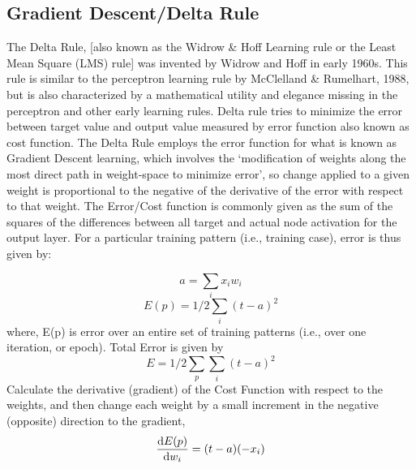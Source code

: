 \documentclass[a4paper,12pt]{report}
\begin{document}
\subsection{Gradient Descent/Delta Rule}
The Delta Rule, [also known as the Widrow \& Hoff Learning rule or the Least Mean Square (LMS) rule] was invented by Widrow and Hoff in early 1960s. This rule is similar to the perceptron learning rule by McClelland \& Rumelhart, 1988, but is also characterized by a mathematical utility and elegance missing in the perceptron and other early learning rules. Delta rule tries to minimize the error between target value and output value measured by error function also known as cost function. The Delta Rule employs the error function for what is known as Gradient Descent learning, which involves the ‘modification of weights along the most direct path in weight-space to minimize error’, so change applied to a given weight is proportional to the negative of the derivative of the error with respect to that weight. The Error/Cost function is commonly given as the sum of the squares of the differences between all target and actual node activation for the output layer. For a particular training pattern (i.e., training case), error is thus given by:

\begin{equation}
a=\sum_i {x_i w_i}
\end{equation}
\begin{equation}
E(p)=1/2 \sum_i {}(t-a)^2
\end{equation}
where, E(p) is error over an entire set of training patterns (i.e., over one iteration, or epoch). Total Error is given by
\begin{equation}
E=1/2 \sum_p \sum_i{}(t-a)^2
\end{equation}
 Calculate the derivative (gradient) of the Cost Function with respect
to the weights, and then change each weight by a small increment in
the negative (opposite) direction to the gradient,
\begin{equation}
\dv{E(p)}{w_i}=(t-a)(-x_i)
\end{equation}
\end{document}
